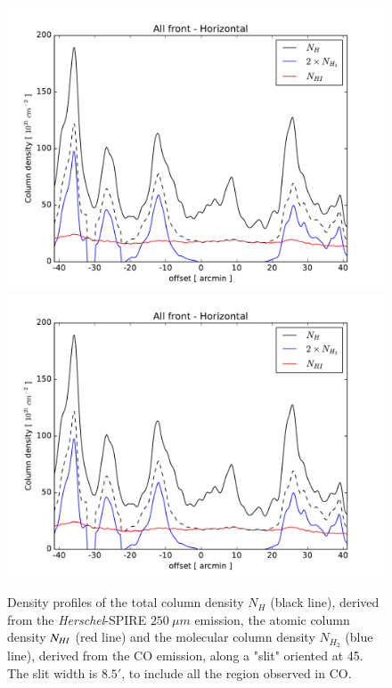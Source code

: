 \documentclass[traditabstract]{aa}
\begin{document}

\begin{figure}[h!]
  \centering
  \includegraphics[page=1,width=0.49\linewidth,trim=25 10 55 25,clip=true]{Figures/Column_density_profiles.pdf}
  \includegraphics[page=4,width=0.49\linewidth,trim=25 10 55 25,clip=true]{Figures/Column_density_profiles.pdf}
  \caption{\label{Col_density} Density profiles of the total column density $N_H$ (black line), derived from the \emph{Herschel}-SPIRE $250\: \mu m$ emission, the atomic column density $N_{H\rmnum{1}}$ (red line) and the molecular column density $N_{H_2}$ (blue line), derived from the CO emission, along a "slit" oriented at 45\degree. The slit width is $8.5'$, to include all the region observed in CO.}
\end{figure}
\end{document}
